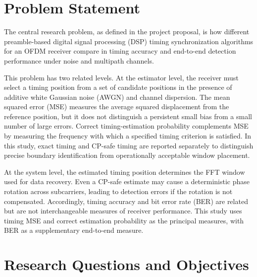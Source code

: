 \section{Problem Statement}
\label{sec:problem-statement}
The central research problem, as defined in the project proposal, is how different preamble-based digital signal processing (DSP) timing synchronization algorithms for an OFDM receiver compare in timing accuracy and end-to-end detection performance under noise and multipath channels.

This problem has two related levels. At the estimator level, the receiver must select a timing position from a set of candidate positions in the presence of additive white Gaussian noise (AWGN) and channel dispersion. The mean squared error (MSE) measures the average squared displacement from the reference position, but it does not distinguish a persistent small bias from a small number of large errors. Correct timing-estimation probability complements MSE by measuring the frequency with which a specified timing criterion is satisfied. In this study, exact timing and CP-safe timing are reported separately to distinguish precise boundary identification from operationally acceptable window placement.

At the system level, the estimated timing position determines the FFT window used for data recovery. Even a CP-safe estimate may cause a deterministic phase rotation across subcarriers, leading to detection errors if the rotation is not compensated. Accordingly, timing accuracy and bit error rate (BER) are related but are not interchangeable measures of receiver performance. This study uses timing MSE and correct estimation probability as the principal measures, with BER as a supplementary end-to-end measure.

\section{Research Questions and Objectives}

